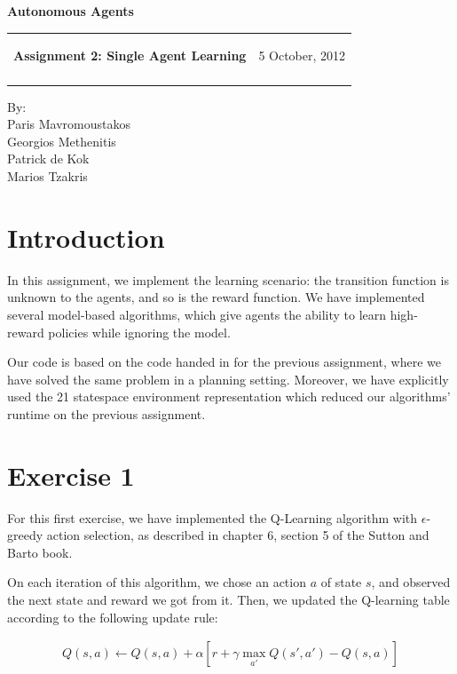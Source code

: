 \documentclass[a4paper,11pt]{article}
\makeatletter
\newcommand{\resheading}[1]{{\large \colorbox{mygrey}{\begin{minipage}{\textwidth}{\textbf{#1 \vphantom{p\^{E}}}}\end{minipage}}}}
\newcommand{\mywebheader}{
  \begin{tabular}{@{}p{5in}p{4in}}
  {\resheading{Assignment 2: Single Agent Learning}} & {\Large 5 October, 2012}\\\vspace{0.2cm}
  \end{tabular}}
\makeatother
\begin{document}
\begin{center}
{\LARGE \textbf{Autonomous Agents}}\\ [1em]
\end{center}
\mywebheader

\begin{center}
{\Large By:} \\ \vspace{0.1cm}
{\Large Paris Mavromoustakos} \\  \vspace{0.1cm}
{\Large Georgios Methenitis} \\ \vspace{0.1cm}
{\Large Patrick de Kok} \\ \vspace{0.1cm}
{\Large Marios Tzakris}
\end{center}




\section*{Introduction}

In this assignment, we implement the learning scenario: the transition function is unknown to the agents, and so is the reward function. We have implemented several model-based algorithms, which give agents the ability to learn high-reward %
policies while ignoring the model.  

Our code is based on the code handed in for the previous assignment, where we have solved the same problem in a planning setting.  Moreover, we have explicitly used the 21 statespace environment representation which reduced our algorithms' runtime on the previous assignment.


\section*{Exercise 1}

For this first exercise, we have implemented the Q-Learning algorithm with $\epsilon$-greedy action selection, as described in chapter 6, section 5 of the Sutton and Barto book.

On each iteration of this algorithm, we chose an action $a$ of state $s$, and observed the next state and reward we got from it. Then, we updated the Q-learning table according to the following update rule:  

\begin{align*}
  Q(s,a) \leftarrow  Q(s,a) + \alpha \left[ r + \gamma  \max_{a'} Q(s',a') - Q(s,a)\right]
\end{align*}
\end{document}
